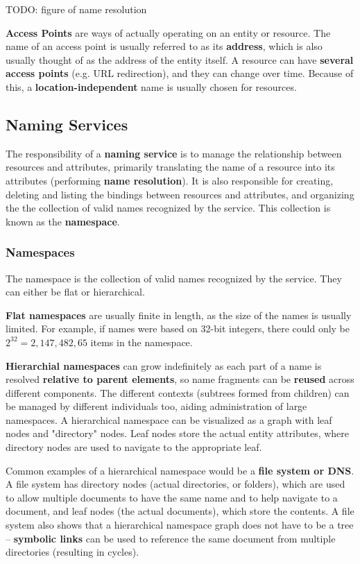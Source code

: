 \documentclass{article}
\begin{document}
TODO: figure of name resolution

\textbf{Access Points} are ways of actually operating on an entity or resource. The name of an access point is usually referred to as its \textbf{address}, which is also usually thought of as the address of the entity itself. A resource can have \textbf{several access points} (e.g. URL redirection), and they can change over time. Because of this, a \textbf{location-independent} name is usually chosen for resources.

\subsection{Naming Services}

The responsibility of a \textbf{naming service} is to manage the relationship between resources and attributes, primarily translating the name of a resource into its attributes (performing \textbf{name resolution}). It is also responsible for creating, deleting and listing the bindings between resources and attributes, and organizing the the collection of valid names recognized by the service. This collection is known as the \textbf{namespace}.

\subsubsection{Namespaces}

The namespace is the collection of valid names recognized by the service. They can either be flat or hierarchical. 

\textbf{Flat namespaces} are usually finite in length, as the size of the names is usually limited. For example, if names were based on 32-bit integers, there could only be $2^{32} = 2,147,482,65$ items in the namespace. 

\textbf{Hierarchial namespaces} can grow indefinitely as each part of a name is resolved \textbf{relative to parent elements}, so name fragments can be \textbf{reused} across different components. The different contexts (subtrees formed from children) can be managed by different individuals too, aiding administration of large namespaces. A hierarchical namespace can be visualized as a graph with leaf nodes and "directory" nodes. Leaf nodes store the actual entity attributes, where directory nodes are used to navigate to the appropriate leaf.

Common examples of a hierarchical namespace would be a \textbf{file system or DNS}. A file system has directory nodes (actual directories, or folders), which are used to allow multiple documents to have the same name and to help navigate to a document, and leaf nodes (the actual documents), which store the contents. A file system also shows that a hierarchical namespace graph does not have to be a tree -- \textbf{symbolic links} can be used to reference the same document from multiple directories (resulting in cycles).
\end{document}

